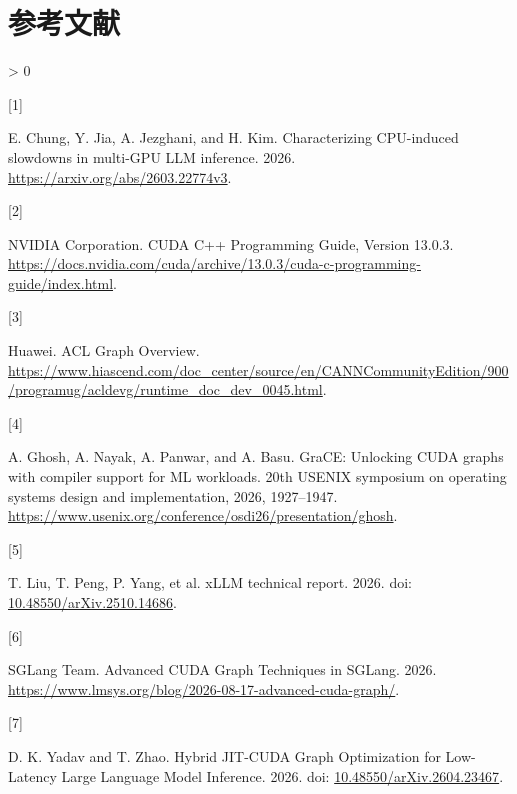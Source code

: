 \documentclass[UTF8,10.5pt,fontset=windows]{ctexart}
\newlength{\cslhangindent}
\newlength{\csllabelwidth}
\newenvironment{CSLReferences}[2] %
 {%
  \setlength{\parindent}{0pt}
  \ifodd #1 \everypar{\setlength{\hangindent}{\cslhangindent}}\ignorespaces\fi
  \ifnum #2 > 0
  \setlength{\parskip}{#2\baselineskip}
  \fi
 }%
 {}
\newcommand{\CSLLeftMargin}[1]{\parbox[t]{\csllabelwidth}{#1}}
\newcommand{\CSLRightInline}[1]{\parbox[t]{\linewidth - \csllabelwidth}{#1}\break}
\begin{document}
\hypertarget{references}{%
\section*{参考文献}\label{references}}

\hypertarget{refs}{}
\begin{CSLReferences}{0}{0}
\leavevmode{}%
\CSLLeftMargin{{[}1{]} }
\CSLRightInline{E. Chung, Y. Jia, A. Jezghani, and H. Kim.
Characterizing CPU-induced slowdowns in multi-GPU LLM inference. 2026.
\url{https://arxiv.org/abs/2603.22774v3}.}

\leavevmode{}%
\CSLLeftMargin{{[}2{]} }
\CSLRightInline{NVIDIA Corporation. {CUDA C++ Programming Guide, Version
13.0.3}.
\url{https://docs.nvidia.com/cuda/archive/13.0.3/cuda-c-programming-guide/index.html}.}

\leavevmode{}%
\CSLLeftMargin{{[}3{]} }
\CSLRightInline{Huawei. {ACL Graph Overview}.
\url{https://www.hiascend.com/doc_center/source/en/CANNCommunityEdition/900/programug/acldevg/runtime_doc_dev_0045.html}.}

\leavevmode{}%
\CSLLeftMargin{{[}4{]} }
\CSLRightInline{A. Ghosh, A. Nayak, A. Panwar, and A. Basu. {GraCE}:
Unlocking {CUDA} graphs with compiler support for {ML} workloads. 20th
USENIX symposium on operating systems design and implementation, 2026,
1927--1947.
\url{https://www.usenix.org/conference/osdi26/presentation/ghosh}.}

\leavevmode{}%
\CSLLeftMargin{{[}5{]} }
\CSLRightInline{T. Liu, T. Peng, P. Yang, et al. xLLM technical report.
2026. doi:
\href{https://doi.org/10.48550/arXiv.2510.14686}{10.48550/arXiv.2510.14686}.}

\leavevmode{}%
\CSLLeftMargin{{[}6{]} }
\CSLRightInline{SGLang Team. {Advanced CUDA Graph Techniques in SGLang}.
2026. \url{https://www.lmsys.org/blog/2026-08-17-advanced-cuda-graph/}.}

\leavevmode{}%
\CSLLeftMargin{{[}7{]} }
\CSLRightInline{D. K. Yadav and T. Zhao. {Hybrid JIT-CUDA Graph
Optimization for Low-Latency Large Language Model Inference}. 2026. doi:
\href{https://doi.org/10.48550/arXiv.2604.23467}{10.48550/arXiv.2604.23467}.}


\end{CSLReferences}
\end{document}
